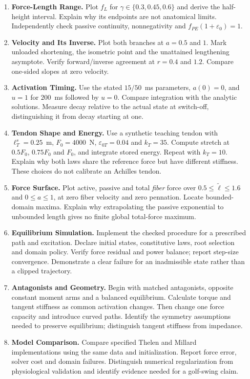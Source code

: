 \begin{enumerate}
 \item \textbf{Force-Length Range.} Plot $f_L$ for
 $\gamma\in\{0.3,0.45,0.6\}$ and derive the half-height interval.
 Explain why its endpoints are not anatomical limits.
 Independently check passive continuity, nonnegativity and
 $f_{PE}(1+\varepsilon_0)=1$.

 \item \textbf{Velocity and Its Inverse.} Plot both branches at $a=0.5$ and $1$.
 Mark unloaded shortening, the isometric point and the unattained lengthening
 asymptote. Verify forward/inverse agreement at $r=0.4$ and $1.2$.
 Compare one-sided slopes at zero velocity.

 \item \textbf{Activation Timing.} Use the stated $15/50$~ms parameters,
 $a(0)=0$, and $u=1$ for $200$~ms followed by $u=0$.
 Compare integration with the analytic solutions. Measure decay relative to
 the actual state at switch-off, distinguishing it from decay starting at one.

 \item \textbf{Tendon Shape and Energy.} Use a synthetic teaching tendon with
 $\ell_T^s=0.25$~m, $F_0=4000$~N, $\varepsilon_{0T}=0.04$ and $k_T=35$.
 Compute stretch at $0.5F_0$, $0.75F_0$ and $F_0$, and integrate stored energy.
 Repeat with $k_T=10$. Explain why both laws share the reference force but
 have different stiffness. These choices do not calibrate an Achilles tendon.

 \item \textbf{Force Surface.} Plot active, passive and total \emph{fiber}
 force over $0.5\leq\tilde\ell\leq1.6$ and $0\leq a\leq1$, at zero fiber
 velocity and zero pennation. Locate bounded-domain maxima.
 Explain why extrapolating the passive exponential to unbounded length gives
 no finite global total-force maximum.

 \item \textbf{Equilibrium Simulation.} Implement the checked procedure for a
 prescribed path and excitation. Declare initial states, constitutive laws,
 root selection and domain policy. Verify force residual and power balance;
 report step-size convergence. Demonstrate a clear failure for an inadmissible
 state rather than a clipped trajectory.

 \item \textbf{Antagonists and Geometry.} Begin with matched antagonists,
 opposite constant moment arms and a balanced equilibrium. Calculate torque
 and tangent stiffness as common activation changes. Then change one force
 capacity and introduce curved paths. Identify the symmetry assumptions
 needed to preserve equilibrium; distinguish tangent stiffness from impedance.

 \item \textbf{Model Comparison.} Compare specified Thelen and Millard
 implementations using the same data and initialization. Report force error,
 solver cost and domain failures. Distinguish numerical regularization from
 physiological validation and identify evidence needed for a golf-swing claim.
\end{enumerate}
